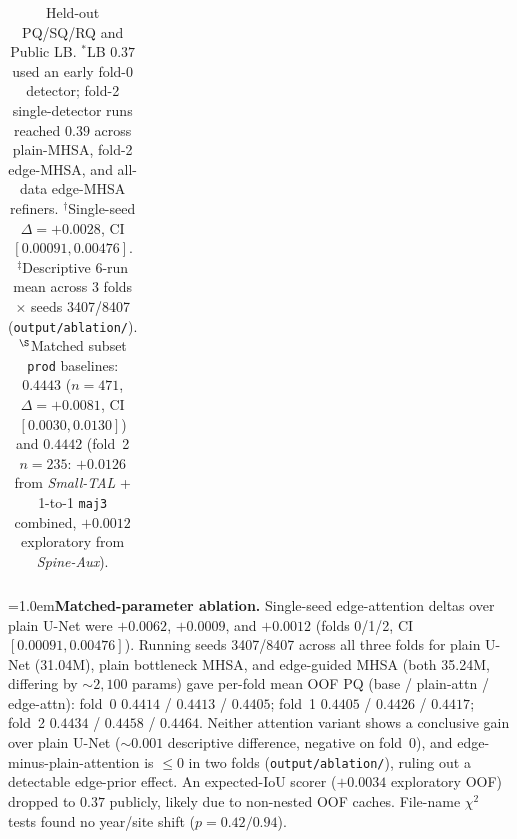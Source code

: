 \documentclass[sigconf]{acmart}
\begin{document}
\begin{table}[t]
\begin{tabularx}{\linewidth}{@{}>{\raggedright\arraybackslash}X r r r@{}}
    \bottomrule
    \end{tabularx}
    \caption{Held-out PQ/SQ/RQ and Public LB. $^{\ast}$LB $0.37$ used an early fold-0 detector; fold-2 single-detector runs reached $0.39$ across plain-MHSA, fold-2 edge-MHSA, and all-data edge-MHSA refiners. $^{\dagger}$Single-seed $\Delta{=}{+}0.0028$, CI $[0.00091,0.00476]$. $^{\ddagger}$Descriptive 6-run mean across 3 folds $\times$ seeds 3407/8407 (\texttt{output/ablation/}). $^{\S}$Matched subset \texttt{prod} baselines: $0.4443$ ($n{=}471$, $\Delta{=}{+}0.0081$, CI $[0.0030,0.0130]$) and $0.4442$ (fold~2 $n{=}235$: $+0.0126$ from \emph{Small-TAL} + 1-to-1 \texttt{maj3} combined, $+0.0012$ exploratory from \emph{Spine-Aux}).}
    \label{tab:results}
    \end{table}

    {\emergencystretch=1.0em\label{sec:matched-param-ablation}\textbf{Matched-parameter ablation.} Single-seed edge-attention deltas over plain U-Net were $+0.0062$, $+0.0009$, and $+0.0012$ (folds 0/1/2, CI $[0.00091,0.00476]$). Running seeds 3407/8407 across all three folds for plain U-Net (31.04M), plain bottleneck MHSA, and edge-guided MHSA (both 35.24M, differing by ${\sim}2{,}100$ params) gave per-fold mean OOF PQ (base / plain-attn / edge-attn): fold~0 $0.4414$ / $0.4413$ / $0.4405$; fold~1 $0.4405$ / $0.4426$ / $0.4417$; fold~2 $0.4434$ / $0.4458$ / $0.4464$. Neither attention variant shows a conclusive gain over plain U-Net (${\sim}0.001$ descriptive difference, negative on fold~0), and edge-minus-plain-attention is $\le\!0$ in two folds (\texttt{output/\allowbreak ablation/}), ruling out a detectable edge-prior effect. An expected-IoU scorer ($+0.0034$ exploratory OOF) dropped to $0.37$ publicly, likely due to non-nested OOF caches. File-name $\chi^2$ tests found no year/site shift ($p{=}0.42/0.94$).\par}
\end{document}
